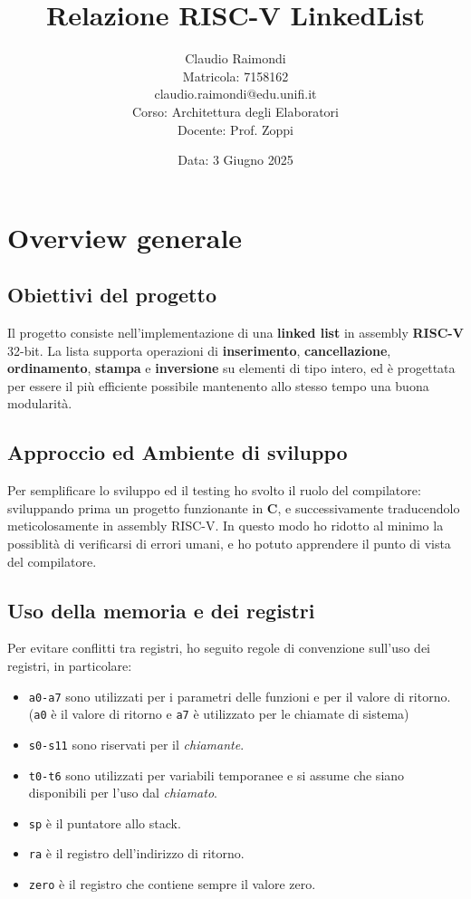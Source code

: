 \documentclass[a4paper,12pt]{article}
\title{\textbf{Relazione RISC-V LinkedList}}
\author{Claudio Raimondi\\Matricola: 7158162\\claudio.raimondi@edu.unifi.it\\
Corso: Architettura degli Elaboratori\\
Docente: Prof. Zoppi}
\date{Data: 3 Giugno 2025}
\begin{document}
\maketitle
\tableofcontents
\thispagestyle{empty}
\newpage
\setcounter{page}{1}

\section{Overview generale}

\subsection{Obiettivi del progetto}

Il progetto consiste nell'implementazione di una \textbf{linked list} in assembly \textbf{RISC-V} 32-bit. 
La lista supporta operazioni di \textbf{inserimento}, \textbf{cancellazione}, \textbf{ordinamento}, \textbf{stampa} e \textbf{inversione} su elementi di tipo intero, ed è progettata per essere il più efficiente possibile mantenento allo stesso tempo una buona modularità.

\subsection{Approccio ed Ambiente di sviluppo}

Per semplificare lo sviluppo ed il testing ho svolto il ruolo del compilatore: sviluppando prima un progetto funzionante in \textbf{C}, e successivamente traducendolo meticolosamente in assembly RISC-V.
In questo modo ho ridotto al minimo la possiblità di verificarsi di errori umani, e ho potuto apprendere il punto di vista del compilatore.

\subsection{Uso della memoria e dei registri}

Per evitare conflitti tra registri, ho seguito regole di convenzione sull'uso dei registri, in particolare:
\begin{itemize}
  \item \texttt{a0-a7} sono utilizzati per i parametri delle funzioni e per il valore di ritorno. (\texttt{a0} è il valore di ritorno e \texttt{a7} è utilizzato per le chiamate di sistema)
  \item \texttt{s0-s11} sono riservati per il \emph{chiamante}.
  \item \texttt{t0-t6} sono utilizzati per variabili temporanee e si assume che siano disponibili per l'uso dal \emph{chiamato}.
  \item \texttt{sp} è il puntatore allo stack.
  \item \texttt{ra} è il registro dell'indirizzo di ritorno.
  \item \texttt{zero} è il registro che contiene sempre il valore zero.
\end{itemize}
\end{document}
